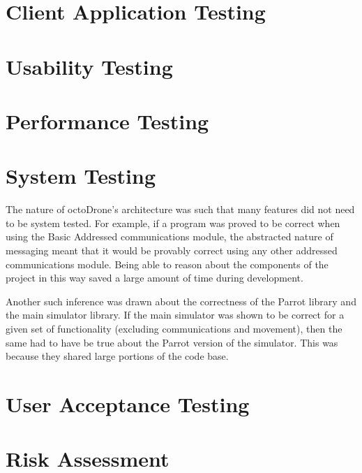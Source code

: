 \section{Client Application Testing}
\section{Usability Testing}
\section{Performance Testing}
\section{System Testing}
The nature of octoDrone's architecture was such that many features did not need to be system tested. For example, if a program was proved to be correct when using the Basic Addressed communications module, the abstracted nature of messaging meant that it would be provably correct using any other addressed communications module. Being able to reason about the components of the project in this way saved a large amount of time during development.

Another such inference was drawn about the correctness of the Parrot library and the main simulator library. If the main simulator was shown to be correct for a given set of functionality (excluding communications and movement), then the same had to have be true about the Parrot version of the simulator. This was because they shared large portions of the code base.

\section{User Acceptance Testing}
\section{Risk Assessment}